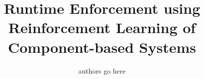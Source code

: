\title{Runtime Enforcement using Reinforcement Learning of Component-based Systems}

\author{authors go here}
